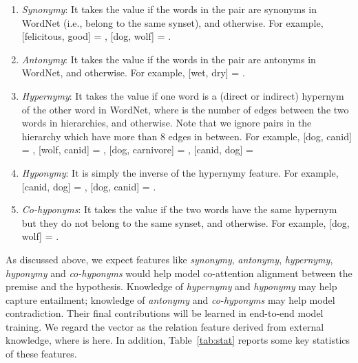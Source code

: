 \documentclass[11pt,a4paper]{article}
\begin{document}
\begin{enumerate}[(1)]
\itemsep 0em
\item \label{itemB} \textit{Synonymy}: It takes the value  if the words in the pair are synonyms in WordNet (i.e., belong to the same synset), and  otherwise. For example, [felicitous, good] = , [dog, wolf] = . 
\item \textit{Antonymy}: It takes the value  if the words in the pair are antonyms in WordNet, and  otherwise. For example, [wet, dry] = . 
\item \textit{Hypernymy}: It takes the value  if one word is a (direct or indirect) hypernym of the other word in WordNet, where  is the number of edges between the two words in hierarchies, and  otherwise. Note that we ignore pairs in the hierarchy which have more than 8 edges in between. For example, [dog, canid] = , [wolf, canid] = , [dog, carnivore] = , [canid, dog] = 
\item \label{itemE} \textit{Hyponymy}: It is simply the inverse of the hypernymy feature.
For example, [canid, dog] = , [dog, canid] = .
\item  \textit{Co-hyponyms}: It takes the value  if the two words have the same hypernym but they do not belong to the same synset, and  otherwise. For example, [dog, wolf] = .
\end{enumerate}

As discussed above, we expect features like \textit{synonymy}, \textit{antonymy}, \textit{hypernymy}, \textit{hyponymy} and \textit{co-hyponyms} would help model co-attention alignment between the premise and the hypothesis. Knowledge of \textit{hypernymy} and \textit{hyponymy} may help capture entailment; knowledge of \textit{antonymy} and \textit{co-hyponyms} may help model contradiction. Their final contributions will be learned in end-to-end model training. We regard the vector  as the relation feature derived from external knowledge, where  is  here. In addition, Table~\ref{tab:stat} reports some key statistics of these features.

\begin{table}[ht]
\renewcommand{\arraystretch}{0.9}
\begin{center}
\end{center}
\caption{Statistics of lexical relation features.}
\label{tab:stat}
\end{table}
\end{document}
